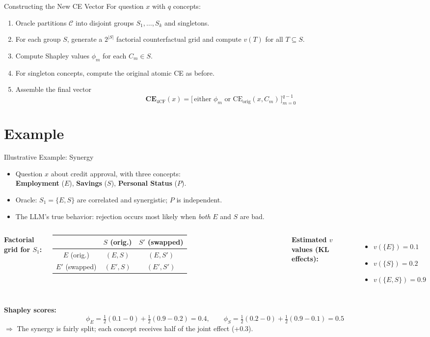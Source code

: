 \documentclass[aspectratio=169]{beamer}
\begin{document}
\begin{frame}{Constructing the New CE Vector}
For question $x$ with $q$ concepts:
\begin{enumerate}
  \item Oracle partitions $\mathcal{C}$ into disjoint groups $S_1,\dots,S_k$ and singletons.
  \item For each group $S$, generate a $2^{|S|}$ factorial counterfactual grid and compute $v(T)$ for all $T\subseteq S$.
  \item Compute Shapley values $\phi_m$ for each $C_m\in S$.
  \item For singleton concepts, compute the original atomic CE as before.
  \item Assemble the final vector
        \[
        \mathbf{CE}_{\text{4CF}}(x) = \big[\, \text{either } \phi_m \text{ or } \mathrm{CE}_{\text{orig}}(x,C_m) \,\big]_{m=0}^{q-1}
        \]
\end{enumerate}
\end{frame}

\section{Example}
\begin{frame}{Illustrative Example: Synergy}
\small
\begin{itemize}
  \item Question $x$ about credit approval, with three concepts:\\
        \textbf{Employment} ($E$), \textbf{Savings} ($S$), \textbf{Personal Status} ($P$).
  \item Oracle: $S_1 = \{E, S\}$ are correlated and synergistic; $P$ is independent.
  \item The LLM’s true behavior: rejection occurs most likely when \emph{both} $E$ and $S$ are bad.
\end{itemize}
\pause
\begin{columns}[T]
\textbf{Factorial grid for $S_1$:}\\[2pt]
\begin{tabular}{c|c|c}
& $S$ (orig.) & $S'$ (swapped) \\ \hline
$E$ (orig.) & $(E,S)$ & $(E,S')$ \\
$E'$ (swapped) & $(E',S)$ & $(E',S')$ \\ \hline
\end{tabular}
\textbf{Estimated $v$ values (KL effects):}
\begin{itemize}
  \item $v(\{E\}) = 0.1$
  \item $v(\{S\}) = 0.2$
  \item $v(\{E,S\}) = 0.9$
\end{itemize}
\end{columns}
\pause
\textbf{Shapley scores:}
\[
\phi_E = \tfrac12(0.1-0) + \tfrac12(0.9-0.2) = 0.4,\qquad
\phi_S = \tfrac12(0.2-0) + \tfrac12(0.9-0.1) = 0.5
\]
$\Rightarrow$ The synergy is fairly split; each concept receives half of the joint effect (+0.3).
\end{frame}
\end{document}
